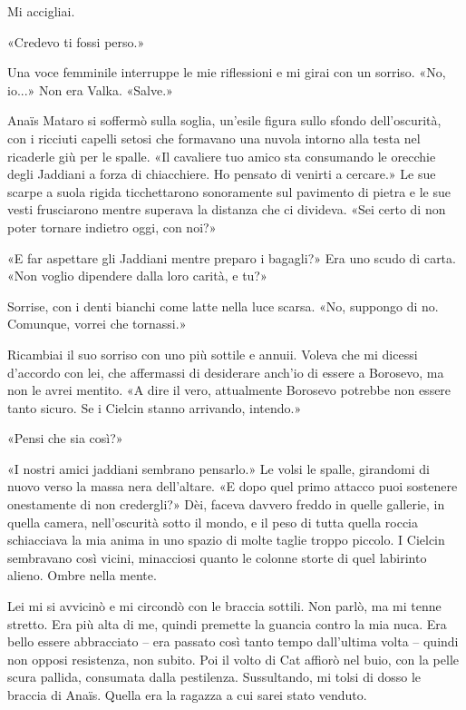 Mi accigliai.

«Credevo ti fossi perso.»

Una voce femminile interruppe le mie riflessioni e mi girai con un
sorriso. «No, io...» Non era Valka. «Salve.»

Anaïs Mataro si soffermò sulla soglia, un'esile figura sullo sfondo
dell'oscurità, con i ricciuti capelli setosi che formavano una nuvola
intorno alla testa nel ricaderle giù per le spalle. «Il cavaliere tuo
amico sta consumando le orecchie degli Jaddiani a forza di chiacchiere.
Ho pensato di venirti a cercare.» Le sue scarpe a suola rigida
ticchettarono sonoramente sul pavimento di pietra e le sue vesti
frusciarono mentre superava la distanza che ci divideva. «Sei certo di
non poter tornare indietro oggi, con noi?»

«E far aspettare gli Jaddiani mentre preparo i bagagli?» Era uno scudo
di carta. «Non voglio dipendere dalla loro carità, e tu?»

Sorrise, con i denti bianchi come latte nella luce scarsa. «No, suppongo
di no. Comunque, vorrei che tornassi.»

Ricambiai il suo sorriso con uno più sottile e annuii. Voleva che mi
dicessi d'accordo con lei, che affermassi di desiderare anch'io di
essere a Borosevo, ma non le avrei mentito. «A dire il vero, attualmente
Borosevo potrebbe non essere tanto sicuro. Se i Cielcin stanno
arrivando, intendo.»

«Pensi che sia così?»

«I nostri amici jaddiani sembrano pensarlo.» Le volsi le spalle,
girandomi di nuovo verso la massa nera dell'altare. «E dopo quel primo
attacco puoi sostenere onestamente di non credergli?» Dèi, faceva
davvero freddo in quelle gallerie, in quella camera, nell'oscurità sotto
il mondo, e il peso di tutta quella roccia schiacciava la mia anima in
uno spazio di molte taglie troppo piccolo. I Cielcin sembravano così
vicini, minacciosi quanto le colonne storte di quel labirinto alieno.
Ombre nella mente.

Lei mi si avvicinò e mi circondò con le braccia sottili. Non parlò, ma
mi tenne stretto. Era più alta di me, quindi premette la guancia contro
la mia nuca. Era bello essere abbracciato -- era passato così tanto
tempo dall'ultima volta -- quindi non opposi resistenza, non subito. Poi
il volto di Cat affiorò nel buio, con la pelle scura pallida, consumata
dalla pestilenza. Sussultando, mi tolsi di dosso le braccia di Anaïs.
Quella era la ragazza a cui sarei stato venduto.

